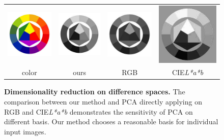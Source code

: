 %

\begin{figure}[t]
\begin{center}
\begin{tabular}{cccc}
\includegraphics[width=0.2\linewidth]{fig/colorwheel.jpg} &
\includegraphics[width=0.2\linewidth]{fig/colorwheel-sparse_dr.png} &
\includegraphics[width=0.2\linewidth]{fig/colorwheel-pca_rgb.png} & 
\includegraphics[width=0.2\linewidth]{fig/colorwheel-pca_lab.png} \\
color & ours & RGB & CIE{\it L*a*b}
\end{tabular}
\caption{
\textbf{Dimensionality reduction on difference spaces.}
The comparison between our method and PCA directly applying on RGB and CIE{\it L*a*b}
demonstrates the sensitivity of PCA on different basis. Our method chooses a reasonable
basis for individual input images.
}\label{fig:PCA}
\end{center}
\end{figure}



